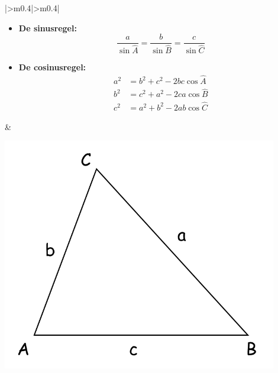 \documentclass[a5paper]{article}
\begin{document}
{\begin{table}[H]
    \centering
    \begin{tabular}{|>{\centering\arraybackslash}m{}|>{\centering\arraybackslash}m{}|}
        \hline
        \begin{minipage}[t]{0.4\textwidth}
            \begin{itemize}
                \item \textbf{De sinusregel:}
                \[
                \frac{a}{\sin \hat{A}} = \frac{b}{\sin \hat{B}} = \frac{c}{\sin \hat{C}}
                \]
                \item \textbf{De cosinusregel:}
                \[
                \begin{aligned}
                    a^2 &= b^2 + c^2 - 2bc\cos \hat{A} \\
                    b^2 &= c^2 + a^2 - 2ca\cos \hat{B} \\
                    c^2 &= a^2 + b^2 - 2ab\cos \hat{C}
                \end{aligned}
                \]
            \end{itemize}
        \end{minipage}
        &
        \begin{minipage}[t]{0.4\textwidth}
            \centering
            \includegraphics[width=0.9\textwidth]{image_goniometrie_sin_cos_regel.png}
            \label{fig:sin_cos_regel}
        \end{minipage} \\ 
        \hline
    \end{tabular}
\end{table}

}
\end{document}
